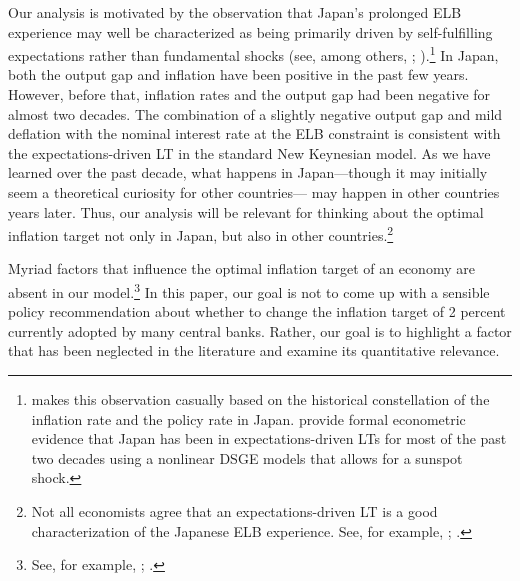 \documentclass[11pt]{article}
\begin{document}
	Our analysis is motivated by the observation that Japan's prolonged ELB experience may well be characterized as being primarily driven by self-fulfilling expectations rather than fundamental shocks (see, among others, \citet{AruobaCubaBordaSchorfheide2018}; \citet{Bullard2010}).\footnote{\citet{Bullard2010} makes this observation casually based on the historical constellation of the inflation rate and the policy rate in Japan. \citet{AruobaCubaBordaSchorfheide2018} provide formal econometric evidence that Japan has been in expectations-driven LTs for most of the past two decades using a nonlinear DSGE models that allows for a sunspot shock.} In Japan, both the output gap and inflation have been positive in the past few years. However, before that, inflation rates and the output gap had been negative for almost two decades. The combination of a slightly negative output gap and mild deflation with the nominal interest rate at the ELB constraint is consistent with the expectations-driven LT in the standard New Keynesian model. As we have learned over the past decade, what happens in Japan---though it may initially seem a theoretical curiosity for other countries--- may happen in other countries years later. Thus, our analysis will be relevant for thinking about the optimal inflation target not only in Japan, but also in other countries.\footnote{Not all economists agree that an expectations-driven LT is a good characterization of the Japanese ELB experience. See, for example, \citet{NishizakiSekineUeno2014}; \citet{Eichenbaum2017}.}


	Myriad factors that influence the optimal inflation target of an economy are absent in our model.\footnote{See, for example, \citet{KileyMauskopfWilcox2007}; \citet{KryvtsovMendes2015}.} In this paper, our goal is not to come up with a sensible policy recommendation about whether to change the inflation target of 2 percent currently adopted by many central banks. Rather, our goal is to highlight a factor that has been neglected in the literature and examine its quantitative relevance.
\end{document}
